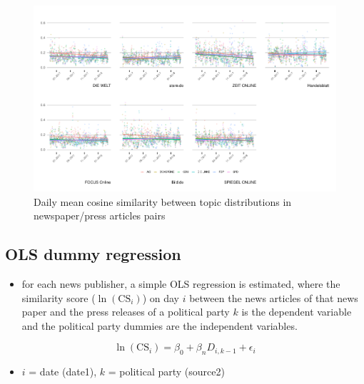 \documentclass[
]{article}
\providecommand{\tightlist}{%
  \setlength{\itemsep}{0pt}\setlength{\parskip}{0pt}}
\begin{document}
\begin{figure}

{\centering \includegraphics[width=1\linewidth]{main_text_files/figure-latex/Daily mean cosine similarity-1} 

}

\caption{Daily mean cosine similarity between topic distributions in newspaper/press articles pairs \label{fig:mean_cosine_sim}}\label{fig:Daily mean cosine similarity}
\end{figure}

\hypertarget{ols-dummy-regression}{%
\subsection{OLS dummy regression}\label{ols-dummy-regression}}

\begin{itemize}
\tightlist
\item
  for each news publisher, a simple OLS regression is estimated, where
  the similarity score (\(\ln(\text{CS}_{i})\)) on day \(i\) between the
  news articles of that news paper and the press releases of a political
  party \(k\) is the dependent variable and the political party dummies
  are the independent variables.
\end{itemize}

\[
\ln(\text{CS}_{i})=\beta_0+\beta_nD_{i,k-1}+\epsilon_i
\]

\begin{itemize}
\tightlist
\item
  \(i\) = date (date1), \(k\) = political party (source2)
\end{itemize}
\end{document}
